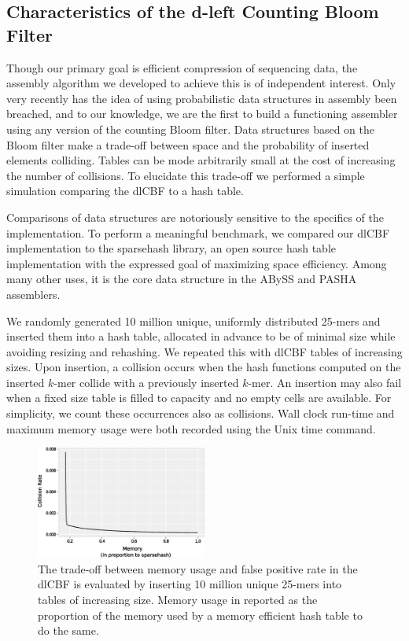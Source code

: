 \documentclass[a4,center,fleqn]{NAR}
\begin{document}
\subsection{Characteristics of the d-left Counting Bloom Filter}

\label{section:dlcbf_results}

Though our primary goal is efficient compression of sequencing data, the
assembly algorithm we developed to achieve this is of independent interest.
Only very recently has the idea of using probabilistic data structures in
assembly been breached, and to our knowledge, we are the first to build a
functioning assembler using any version of the counting Bloom filter. Data
structures based on the Bloom filter make a trade-off between space and
the probability of inserted elements colliding. Tables can be mode arbitrarily
small at the cost of increasing the number of collisions. To elucidate this
trade-off we performed a simple simulation comparing the dlCBF to a hash table.

Comparisons of data structures are notoriously sensitive to the specifics of
the implementation. To perform a meaningful benchmark, we compared our dlCBF
implementation to the sparsehash library, an open source hash table
implementation with the expressed goal of maximizing space efficiency. Among
many other uses, it is the core data structure in the ABySS
\citep{Simpson2011} and PASHA \citep{Liu2011} assemblers.

We randomly generated 10 million unique, uniformly distributed 25-mers and
inserted them into a hash table, allocated in advance to be of minimal size
while avoiding resizing and rehashing. We repeated this with dlCBF tables of
increasing sizes. Upon insertion, a collision occurs when the hash functions
computed on the inserted $k$-mer collide with a previously inserted $k$-mer.
An insertion may also fail when a fixed size table is filled to capacity and
no empty cells are available. For simplicity, we count these occurrences also
as collisions. Wall clock run-time and maximum memory usage were both recorded
using the Unix time command.

\begin{figure}[h]
\centerline{\includegraphics[width=0.5\textwidth]{dlcbf.eps}}
\caption{
The trade-off between memory usage and false positive rate in the dlCBF is
evaluated by inserting 10 million unique 25-mers into tables of increasing
size. Memory usage in reported as the proportion of the memory used by a
memory efficient hash table to do the same.
}
\label{fig:dlcbf_bench}
\end{figure}
\end{document}
